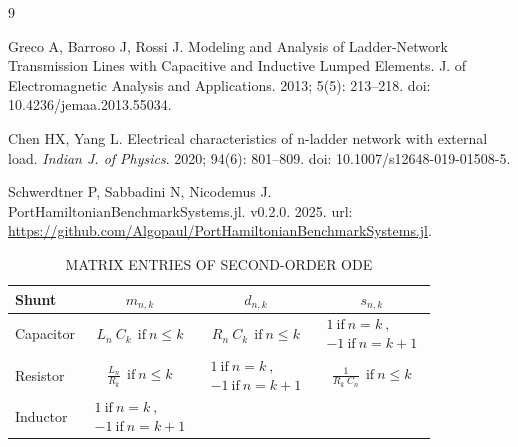 \documentclass[a4paper, nobib,justified]{tufte-handout}
\begin{document}
\begin{thebibliography}{9}
	\raggedright
	Greco A, Barroso J, Rossi J. Modeling and Analysis of Ladder-Network Transmission Lines with Capacitive and Inductive Lumped Elements. {J. of Electromagnetic Analysis and Applications}. 2013; 5(5): 213--218. doi: 10.4236/jemaa.2013.55034. 
	
	\raggedright
	Chen HX, Yang L. Electrical characteristics of n-ladder network with external load. {\itshape Indian J. of Physics}. 2020; 94(6): 801--809. doi: {10.1007/s12648-019-01508-5}.
	
	\raggedright
	Schwerdtner P, Sabbadini N, Nicodemus J. PortHamiltonianBenchmarkSystems.jl. v0.2.0. 2025. url: {\url{https://github.com/Algopaul/PortHamiltonianBenchmarkSystems.jl}}.	
	\end{thebibliography}
	
	\newpage

\begin{table}[b]
	\renewcommand{\arraystretch}{1.3}
	\centering
	\caption{\MakeUppercase{Matrix Entries of Second-Order ODE}}
	\begin{tabular}{l | c c c}
		\toprule
		Shunt & $m_{n,k}$ & $d_{n,k}$ & $s_{n,k}$ \\
		\midrule
		Capacitor &
		$L_{n}~C_{k} ~~\text{if} ~ n \leq k$ 
		& $	R_{n}~C_{k} ~~\text{if} ~ n \leq k$ & 
		$\begin{matrix}
			1 ~\text{if} ~ n = k ~\text{,}\\
			-1 ~\text{if} ~ n = k+1
		\end{matrix}$ \\
		Resistor &
		$\frac{L_{n}}{R_{k}} ~~\text{if} ~ n \leq k$ &
		$\begin{matrix}
			1 ~\text{if} ~ n = k ~\text{,}\\
			-1 ~\text{if} ~ n = k+1
		\end{matrix}$ & 
		$\frac{1}{R_{k}~ C_{n}}~~\text{if} ~ n \leq k$ \\
		Inductor &
		$\begin{matrix}
			1 ~\text{if} ~ n = k ~\text{,}\\
			-1 ~\text{if} ~ n = k+1
		\end{matrix}$ &
		&
		\\
		\bottomrule
	\end{tabular}
	\label{table:overview_matrix_entries}
\end{table}	
	
	
\end{document}
